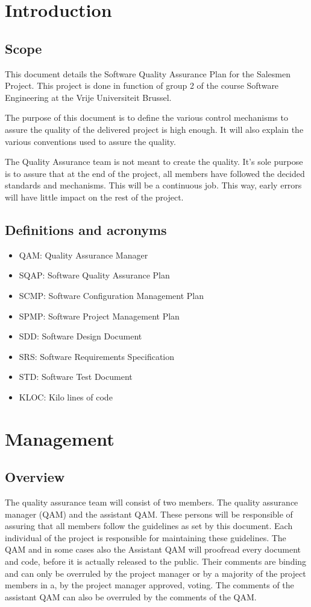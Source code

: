 \documentclass[salesmen, twoside]{softproj}
\begin{document}
\begin{projdoc}
\chapter{Introduction}
\section{Scope}
This document details the Software Quality Assurance Plan for the Salesmen Project. This project is done in function of group 2 of the course Software Engineering at the Vrije Universiteit Brussel.

The purpose of this document is to define the various control mechanisms to assure the quality of the delivered project is high enough. It will also explain the various conventions used to assure the quality.

The Quality Assurance team is not meant to create the quality. It's sole purpose is to assure that at the end of the project, all members have followed the decided standards and mechanisms. This will be a continuous job. This way, early errors will have little impact on the rest of the project.

\section{Definitions and acronyms}
\begin{itemize}
\item QAM: Quality Assurance Manager
\item SQAP: Software Quality Assurance Plan
\item SCMP: Software Configuration Management Plan 
\item SPMP: Software Project Management Plan
\item SDD: Software Design Document
\item SRS: Software Requirements Specification
\item STD: Software Test Document
\item KLOC: Kilo lines of code
\end{itemize}


\chapter{Management}
\section{Overview}
The quality assurance team will consist of two members. The quality assurance manager (QAM) and the assistant QAM. These persons will be responsible of assuring that all members follow the guidelines as set by this document. Each individual of the project is responsible for maintaining these guidelines. The QAM and in some cases also the Assistant QAM will proofread every document and code, before it is actually released to the public. Their comments are binding and can only be overruled by the project manager or by a majority of the project members in a, by the project manager approved, voting. The comments of the assistant QAM can also be overruled by the comments of the QAM.



\end{projdoc}
\end{document}
